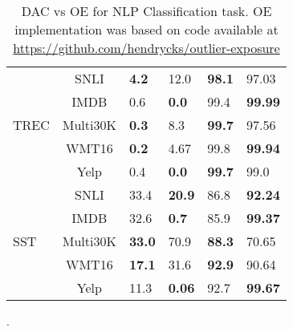 \documentclass[accepted]{uai2021} \pdfoutput=1
\begin{document}
\begin{table}[htbp]
{\begin{tabular}{lcllll}
\multicolumn{1}{l|}{\multirow{5}{*}{TREC}}         & \multicolumn{1}{c|}{SNLI}                & \textbf{4.2}             & \multicolumn{1}{l|}{12.0}           & \textbf{98.1}                    & 97.03                               \\
\multicolumn{1}{l|}{}                              & \multicolumn{1}{c|}{IMDB}                & 0.6                      & \multicolumn{1}{l|}{\textbf{0.0}}   & 99.4                             & \textbf{99.99}                       \\
\multicolumn{1}{l|}{}                              & \multicolumn{1}{c|}{Multi30K}            & \textbf{0.3}             & \multicolumn{1}{l|}{8.3}            & \textbf{99.7}                    & 97.56                                \\
\multicolumn{1}{l|}{}                              & \multicolumn{1}{c|}{WMT16}               & \textbf{0.2}             & \multicolumn{1}{l|}{4.67}          & 99.8                             & \textbf{99.94}                       \\
\multicolumn{1}{l|}{}                              & \multicolumn{1}{c|}{Yelp}                & 0.4                      & \multicolumn{1}{l|}{\textbf{0.0}}   & \textbf{99.7}                    & 99.0                                 \\ \hline
\multicolumn{1}{l|}{\multirow{5}{*}{SST}}          & \multicolumn{1}{c|}{SNLI}                & 33.4                     & \multicolumn{1}{l|}{\textbf{20.9}}  & 86.8                             & \textbf{92.24}                      \\
\multicolumn{1}{l|}{}                              & \multicolumn{1}{c|}{IMDB}                & 32.6                     & \multicolumn{1}{l|}{\textbf{0.7}}  & 85.9                             & \textbf{99.37}                       \\
\multicolumn{1}{l|}{}                              & \multicolumn{1}{c|}{Multi30K}            & \textbf{33.0}            & \multicolumn{1}{l|}{70.9}           & \textbf{88.3}                    & 70.65                                \\
\multicolumn{1}{l|}{}                              & \multicolumn{1}{c|}{WMT16}               & \textbf{17.1}            & \multicolumn{1}{l|}{31.6}           & \textbf{92.9}                    & 90.64                                \\
\multicolumn{1}{l|}{}                              & \multicolumn{1}{c|}{Yelp}                & 11.3                     & \multicolumn{1}{l|}{\textbf{0.06}}  & 92.7                             & \textbf{99.67}                      \\ \hline
\end{tabular}}
\caption{DAC vs OE for NLP Classification task. OE implementation was based on code available at \url{https://github.com/hendrycks/outlier-exposure}}.  
 	\label{tab:vs_OE_NLP}
\end{table}
 
\end{document}
